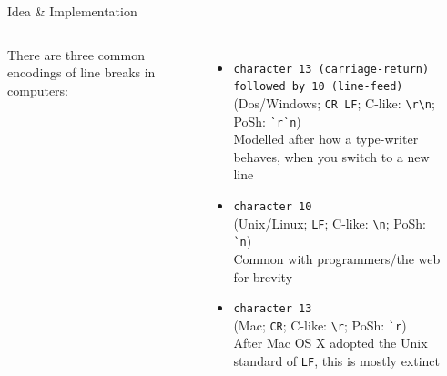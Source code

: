 \documentclass[english,aspectratio=169]{beamer}
\begin{document}
\begin{frame}{Idea \& Implementation}
\begin{columns}
        There are three common encodings of line breaks in computers:
        \begin{itemize}
            \item \texttt{character 13 (carriage-return) followed by 10 (line-feed)}\\
            \smallskip\scriptsize(Dos/Windows; \texttt{CR LF}; C-like: \texttt{\textbackslash{}r\textbackslash{}n}; PoSh: \texttt{\`{}r\`{}n})\\
            \normalsize{}Modelled after how a type-writer behaves, when you switch to a new line
            \item \texttt{character 10}\\
            \smallskip\scriptsize(Unix/Linux; \texttt{LF}; C-like: \texttt{\textbackslash{}n}; PoSh: \texttt{\`{}n})\\
            \normalsize{}Common with programmers/the web for brevity
            \item \texttt{character 13}\\
            \smallskip\scriptsize(Mac; \texttt{CR}; C-like: \texttt{\textbackslash{}r}; PoSh: \texttt{\`{}r})\\
            \normalsize{}After Mac OS X adopted the Unix standard of \texttt{LF}, this is mostly extinct
        \end{itemize}
        \begin{center}
        \end{center}
    \end{columns}
\end{frame}
\end{document}
